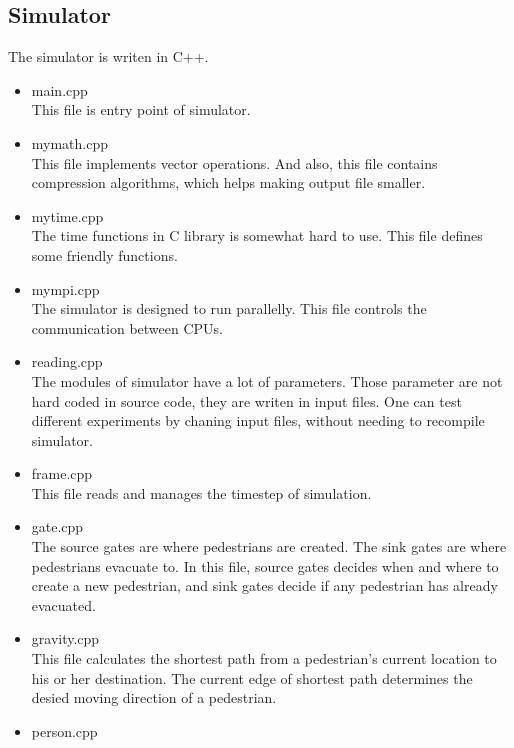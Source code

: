 \documentclass{article}
\begin{document}
        \subsection{Simulator}
            The simulator is writen in C++.
            \begin{itemize}
                \item{main.cpp} \\
                    This file is entry point of simulator.
                \item{mymath.cpp} \\
                    This file implements vector operations.
                    And also, this file contains compression algorithms, which helps making output file smaller.
                \item{mytime.cpp} \\
                    The time functions in C library is somewhat hard to use.
                    This file defines some friendly functions.
                \item{mympi.cpp} \\
                    The simulator is designed to run parallelly. This file controls the communication between CPUs.
                \item{reading.cpp} \\
                    The modules of simulator have a lot of parameters. Those parameter are not hard coded in source code, they are writen in input files. One can test different experiments by chaning input files, without needing to recompile simulator.
                \item{frame.cpp} \\
                    This file reads and manages the timestep of simulation.
                \item{gate.cpp} \\
                    The source gates are where pedestrians are created. The sink gates are where pedestrians evacuate to.
                    In this file, source gates decides when and where to create a new pedestrian, and sink gates decide if any pedestrian has already evacuated.
                \item{gravity.cpp} \\
                    This file calculates the shortest path from a pedestrian's current location to his or her destination. The current edge of shortest path determines the desied moving direction of a pedestrian.
                \item{person.cpp} \\

\end{itemize}
\end{document}
